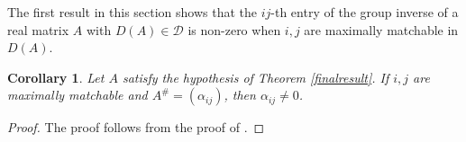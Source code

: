 \documentclass[notitlepage,12pt,reqno]{amsart}
\newtheorem{cor}[thm]{Corollary}
\numberwithin{equation}{section}
\begin{document}
The first result in this section shows that the $ij$-th entry of the group inverse of a real matrix $A$ with $D(A)\in \mathcal{D}$ is non-zero when $i,j$ are maximally matchable in $D(A)$.
\begin{cor}\label{nonzero}
Let $A$ satisfy the hypothesis of Theorem \ref{finalresult}. If $i,j$ are maximally matchable and $A^{\#}=(\alpha _{ij})$, then $\alpha _{ij}\neq 0$.
\end{cor}
\begin{proof}
The proof follows from the proof of \cite[Corollary 2.12]{nandi}.
\end{proof}
\end{document}
